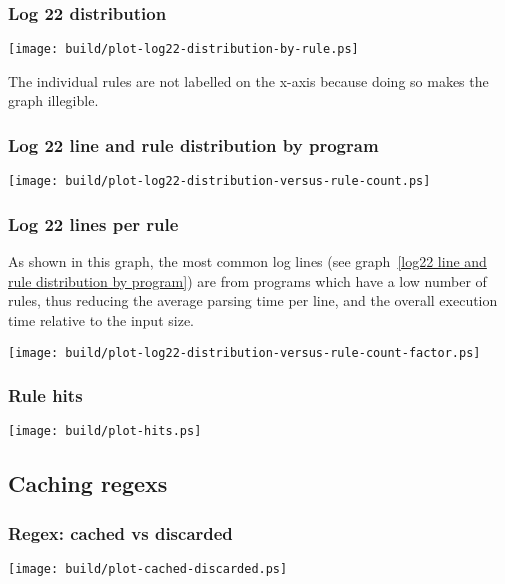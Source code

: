 \documentclass[a4paper,12pt,draft]{article}
\begin{document}
\noindent

\subsubsection{Log 22 distribution}
\label{log22 distribution by rule}
\texttt{[image: build/plot-log22-distribution-by-rule.ps]}

The individual rules are not labelled on the x-axis because doing so makes
the graph illegible.

\subsubsection{Log 22 line and rule distribution by program}
\label{log22 line and rule distribution by program}

\noindent
\texttt{[image: build/plot-log22-distribution-versus-rule-count.ps]}

\subsubsection{Log 22 lines per rule}
\label{log22 lines per rule}

As shown in this graph, the most common log lines (see graph~\ref{log22
line and rule distribution by program}) are from programs which have a low
number of rules, thus reducing the average parsing time per line, and the
overall execution time relative to the input size.

\noindent
\texttt{[image: build/plot-log22-distribution-versus-rule-count-factor.ps]}


\subsubsection{Rule hits}
\label{rule hits}

\noindent\texttt{[image: build/plot-hits.ps]}



\subsection{Caching regexs}

\subsubsection{Regex: cached vs discarded}
\label{normal regex vs discard regex}
\texttt{[image: build/plot-cached-discarded.ps]}
\end{document}
